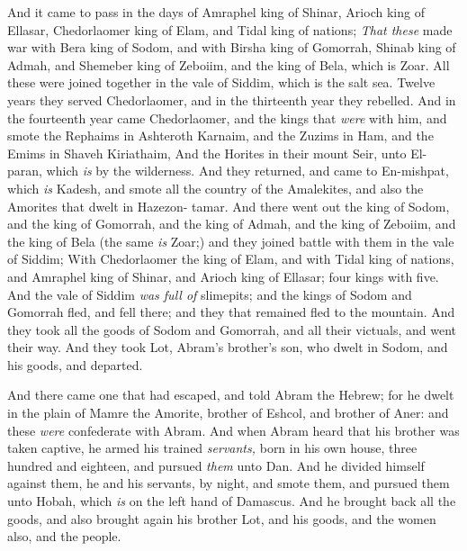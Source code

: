 \documentclass[11pt,letterpaper,oneside]{memoir}
\begin{document}
And it came to pass in the days of Amraphel king of Shinar, Arioch king
of Ellasar, Chedorlaomer king of Elam, and Tidal king of nations;
\emph{That these} made war with Bera king of Sodom, and with Birsha king
of Gomorrah, Shinab king of Admah, and Shemeber king of Zeboiim, and the
king of Bela, which is Zoar. All these were joined together in the vale
of Siddim, which is the salt sea. Twelve years they served Chedorlaomer,
and in the thirteenth year they rebelled. And in the fourteenth year
came Chedorlaomer, and the kings that \emph{were} with him, and smote
the Rephaims in Ashteroth Karnaim, and the Zuzims in Ham, and the Emims
in Shaveh Kiriathaim, And the Horites in their mount Seir, unto
El-paran, which \emph{is} by the wilderness. And they returned, and came
to En-mishpat, which \emph{is} Kadesh, and smote all the country of the
Amalekites, and also the Amorites that dwelt in Hazezon- tamar. And
there went out the king of Sodom, and the king of Gomorrah, and the king
of Admah, and the king of Zeboiim, and the king of Bela (the same
\emph{is} Zoar;) and they joined battle with them in the vale of Siddim;
With Chedorlaomer the king of Elam, and with Tidal king of nations, and
Amraphel king of Shinar, and Arioch king of Ellasar; four kings with
five. And the vale of Siddim \emph{was full of} slimepits; and the kings
of Sodom and Gomorrah fled, and fell there; and they that remained fled
to the mountain. And they took all the goods of Sodom and Gomorrah, and
all their victuals, and went their way. And they took Lot, Abram's
brother's son, who dwelt in Sodom, and his goods, and departed.

And there came one that had escaped, and told Abram the Hebrew; for he
dwelt in the plain of Mamre the Amorite, brother of Eshcol, and brother
of Aner: and these \emph{were} confederate with Abram. And when Abram
heard that his brother was taken captive, he armed his trained
\emph{servants,} born in his own house, three hundred and eighteen, and
pursued \emph{them} unto Dan. And he divided himself against them, he
and his servants, by night, and smote them, and pursued them unto Hobah,
which \emph{is} on the left hand of Damascus. And he brought back all
the goods, and also brought again his brother Lot, and his goods, and
the women also, and the people.
\end{document}
